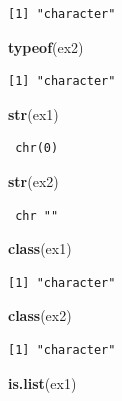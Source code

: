 \documentclass[]{book}
\newenvironment{Shaded}{\begin{snugshade}}{\end{snugshade}}
\newcommand{\KeywordTok}[1]{\textcolor[rgb]{0.13,0.29,0.53}{\textbf{#1}}}
\newcommand{\NormalTok}[1]{#1}
\theoremstyle{definition}
\theoremstyle{definition}
\theoremstyle{definition}
\theoremstyle{remark}
\begin{document}
\begin{verbatim}
[1] "character"
\end{verbatim}

\begin{Shaded}
\begin{Highlighting}[]
\KeywordTok{typeof}\NormalTok{(ex2)}
\end{Highlighting}
\end{Shaded}

\begin{verbatim}
[1] "character"
\end{verbatim}

\begin{Shaded}
\begin{Highlighting}[]
\KeywordTok{str}\NormalTok{(ex1)}
\end{Highlighting}
\end{Shaded}

\begin{verbatim}
 chr(0) 
\end{verbatim}

\begin{Shaded}
\begin{Highlighting}[]
\KeywordTok{str}\NormalTok{(ex2)}
\end{Highlighting}
\end{Shaded}

\begin{verbatim}
 chr ""
\end{verbatim}

\begin{Shaded}
\begin{Highlighting}[]
\KeywordTok{class}\NormalTok{(ex1)}
\end{Highlighting}
\end{Shaded}

\begin{verbatim}
[1] "character"
\end{verbatim}

\begin{Shaded}
\begin{Highlighting}[]
\KeywordTok{class}\NormalTok{(ex2)}
\end{Highlighting}
\end{Shaded}

\begin{verbatim}
[1] "character"
\end{verbatim}

\begin{Shaded}
\begin{Highlighting}[]
\KeywordTok{is.list}\NormalTok{(ex1)}
\end{Highlighting}
\end{Shaded}
\end{document}
